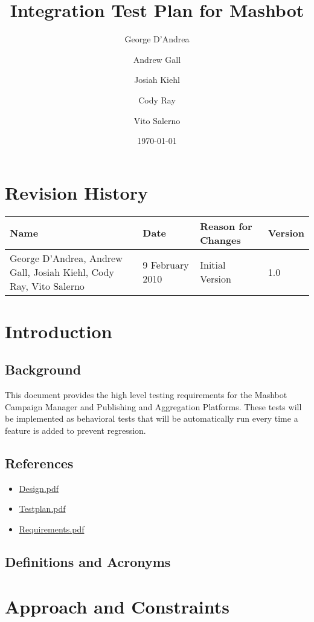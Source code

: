 \documentclass[12pt]{article}
\title{Integration Test Plan for Mashbot}
\author{George D'Andrea \and Andrew Gall \and Josiah Kiehl \and
  Cody Ray \and Vito Salerno}
\date{\today}
\begin{document}
\begin{titlepage}
\maketitle
\end{titlepage}

\section*{Revision History}
\begin{tabular}{|p{2in}|l|l|l|}
  \hline
  \textbf{Name} & \textbf{Date} & \textbf{Reason for Changes} & \textbf{Version} \\
  \hline \hline
  George D'Andrea, Andrew Gall, Josiah Kiehl, Cody Ray, Vito
  Salerno & 9 February 2010 & Initial Version & 1.0 \\
  \hline
\end{tabular}

\clearpage
\tableofcontents
\clearpage

\section{Introduction}
\subsection{Background}
This document provides the high level testing requirements for the Mashbot Campaign Manager and Publishing and Aggregation Platforms.  These tests will be implemented as behavioral tests that will be automatically run every time a feature is added to prevent regression.
\subsection{References}
\begin{itemize}
\item \href{http://mashbot.heroku.com/doc/Design.pdf}{Design.pdf}
\item \href{http://mashbot.heroku.com/doc/Testplan.pdf}{Testplan.pdf}
\item \href{http://mashbot.heroku.com/doc/Requirements.pdf}{Requirements.pdf}
\end{itemize}
\subsection{Definitions and Acronyms}

\section{Approach and Constraints}
\end{document}

